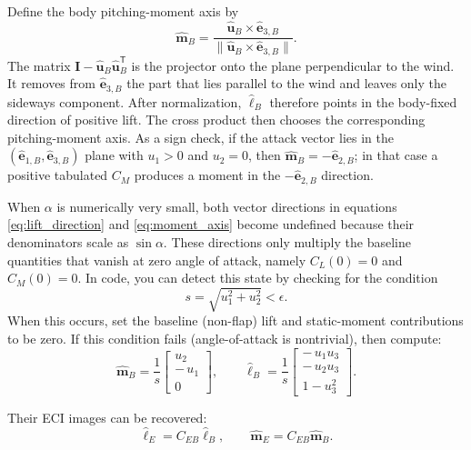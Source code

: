 Define the body pitching-moment axis by
\begin{equation}
\hat{\mathbf m}_B
=
\frac{\hat{\mathbf u}_B\times \hat{\mathbf e}_{3,B}}
{\|\hat{\mathbf u}_B\times \hat{\mathbf e}_{3,B}\|}. \label{eq:moment_axis}
\end{equation}
The matrix \(\mathbf I-\hat{\mathbf u}_B\hat{\mathbf u}_B^{\mathsf T}\) is the projector onto the plane perpendicular to the wind. It removes from \(\hat{\mathbf e}_{3,B}\) the part that lies parallel to the wind and leaves only the sideways component. After normalization, \(\hat{\boldsymbol\ell}_B\) therefore points in the body-fixed direction of positive lift. The cross product then chooses the corresponding pitching-moment axis. As a sign check, if the attack vector lies in the \((\hat{\mathbf e}_{1,B},\hat{\mathbf e}_{3,B})\) plane with \(u_1>0\) and \(u_2=0\), then \(\hat{\mathbf m}_B=-\hat{\mathbf e}_{2,B}\); in that case a positive tabulated \(C_M\) produces a moment in the \(-\hat{\mathbf e}_{2,B}\) direction.

When \(\alpha\) is numerically very small, both vector directions in equations \eqref{eq:lift_direction} and \eqref{eq:moment_axis} become undefined because their denominators scale as \(\sin\alpha\). These directions only multiply the baseline quantities that vanish at zero angle of attack, namely \(C_L(0)=0\) and \(C_M(0)=0\). In code, you can detect this state by checking for the condition 
\begin{equation}
s=\sqrt{u_1^2+u_2^2}<\epsilon.    
\end{equation}
When this occurs, set the baseline (non-flap) lift and static-moment contributions to be zero. If this condition fails (angle-of-attack is nontrivial), then compute: 
\begin{equation}
\hat{\mathbf m}_B = \frac{1}{s}
\begin{bmatrix}
u_2 \\
-\,u_1 \\
0
\end{bmatrix},
\qquad
\hat{\boldsymbol \ell}_B = \frac{1}{s}
\begin{bmatrix}
-\,u_1 u_3 \\
-\,u_2 u_3 \\
1 - u_3^2
\end{bmatrix}.
\end{equation}

Their ECI images can be recovered:
\begin{equation}
\hat{\boldsymbol\ell}_E=C_{EB}\hat{\boldsymbol\ell}_B,
\qquad
\hat{\mathbf m}_E=C_{EB}\hat{\mathbf m}_B.
\end{equation}


